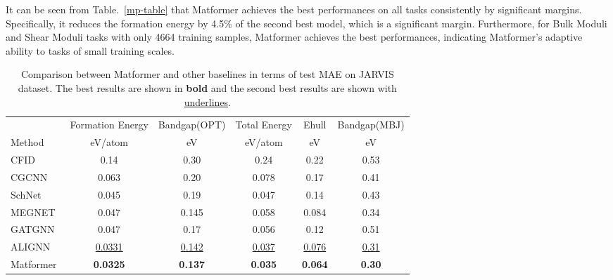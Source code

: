 \documentclass{article}
\begin{document}
It can be seen from Table.~\ref{mp-table} that Matformer achieves the best performances on all tasks consistently by significant margins. Specifically, it reduces the formation energy by 4.5\% of the second best model, which is a significant margin. Furthermore, for Bulk Moduli and Shear Moduli tasks with only 4664 training samples, Matformer achieves the best performances, indicating Matformer's adaptive ability to tasks of small training scales.




\begin{table}[t]
  \caption{Comparison between Matformer and other baselines in terms of test MAE on JARVIS dataset. The best results are shown in \textbf{bold} and the second best results are shown with \uline{underlines}.}
  \label{jarvis-table}
  \centering
  \begin{tabular}{lccccc}
    \toprule
& Formation Energy & Bandgap(OPT) & Total Energy & Ehull & Bandgap(MBJ) \\
    \cmidrule(r){2-6}
    Method & eV/atom  &  eV & eV/atom & eV & eV    \\
    \midrule
    CFID~\citep{cfid} & 0.14 &    0.30 & 0.24 & 0.22 &  0.53  \\
    CGCNN~\citep{cgcnn}  & 0.063 &   0.20 & 0.078 & 0.17 & 0.41  \\
    SchNet~\citep{schnet} & 0.045 &   0.19 & 0.047 & 0.14 & 0.43  \\
    MEGNET~\citep{megnet}  & 0.047 &   0.145 & 0.058 & 0.084 & 0.34 \\
    GATGNN~\citep{gatgnn}  & 0.047 &   0.17 & 0.056 & 0.12 & 0.51             \\
    ALIGNN~\citep{alignn} & \uline{0.0331} &  \uline{0.142} & \uline{0.037} & \uline{0.076} & \uline{0.31}  \\
    Matformer & \textbf{0.0325} & \textbf{0.137} & \textbf{0.035} & \textbf{0.064} & \textbf{0.30}   \\
    \bottomrule
  \end{tabular}
  \vspace{-3mm}
\end{table}
\end{document}
